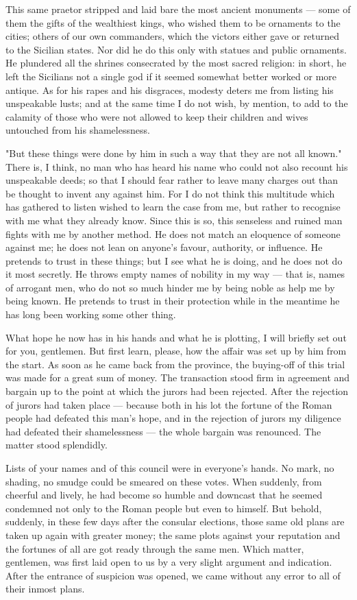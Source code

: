  This same praetor stripped and laid bare the most ancient monuments --- some of them the gifts of the wealthiest kings, who wished them to be ornaments to the cities; others of our own commanders, which the victors either gave or returned to the Sicilian states. Nor did he do this only with statues and public ornaments. He plundered all the shrines consecrated by the most sacred religion: in short, he left the Sicilians not a single god if it seemed somewhat better worked or more antique. As for his rapes and his disgraces, modesty deters me from listing his unspeakable lusts; and at the same time I do not wish, by mention, to add to the calamity of those who were not allowed to keep their children and wives untouched from his shamelessness.

 "But these things were done by him in such a way that they are not all known." There is, I think, no man who has heard his name who could not also recount his unspeakable deeds; so that I should fear rather to leave many charges out than be thought to invent any against him. For I do not think this multitude which has gathered to listen wished to learn the case from me, but rather to recognise with me what they already know. Since this is so, this senseless and ruined man fights with me by another method. He does not match an eloquence of someone against me; he does not lean on anyone's favour, authority, or influence. He pretends to trust in these things; but I see what he is doing, and he does not do it most secretly. He throws empty names of nobility in my way --- that is, names of arrogant men, who do not so much hinder me by being noble as help me by being known. He pretends to trust in their protection while in the meantime he has long been working some other thing.

 What hope he now has in his hands and what he is plotting, I will briefly set out for you, gentlemen. But first learn, please, how the affair was set up by him from the start. As soon as he came back from the province, the buying-off of this trial was made for a great sum of money. The transaction stood firm in agreement and bargain up to the point at which the jurors had been rejected. After the rejection of jurors had taken place --- because both in his lot the fortune of the Roman people had defeated this man's hope, and in the rejection of jurors my diligence had defeated their shamelessness --- the whole bargain was renounced. The matter stood splendidly.

 Lists of your names and of this council were in everyone's hands. No mark, no shading, no smudge could be smeared on these votes. When suddenly, from cheerful and lively, he had become so humble and downcast that he seemed condemned not only to the Roman people but even to himself. But behold, suddenly, in these few days after the consular elections, those same old plans are taken up again with greater money; the same plots against your reputation and the fortunes of all are got ready through the same men. Which matter, gentlemen, was first laid open to us by a very slight argument and indication. After the entrance of suspicion was opened, we came without any error to all of their inmost plans.


